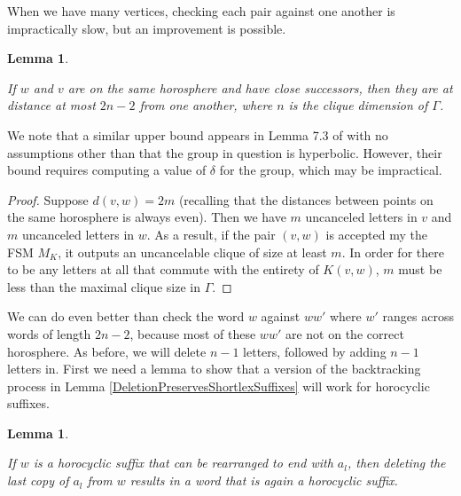 \documentclass{amsart}
\newtheorem{lemma}[theorem]{Lemma}
\theoremstyle{definition}
\theoremstyle{remark}
\begin{document}
	When we have many vertices, checking each pair against one another is impractically slow, but an improvement is possible. 
	
	\begin{lemma}\label{MaximumDistanceForDivergenceEdge}
		
		If $w$ and $v$ are on the same horosphere and have close successors, then they are at distance at most $2n-2$ from one another, where $n$ is the clique dimension of $\Gamma$.
		
	\end{lemma}
	
	We note that a similar upper bound appears in Lemma 7.3 of \cite{CGSR} with no assumptions other than that the group in question is hyperbolic. However, their bound requires computing a value of $\delta$ for the group, which may be impractical.
	
	\begin{proof}
		
		Suppose $d(v,w)=2m$ (recalling that the distances between points on the same horosphere is always even). Then we have $m$ uncanceled letters in $v$ and $m$ uncanceled letters in $w$. As a result, if the pair $(v,w)$ is accepted my the FSM $M_K$, it outputs an uncancelable clique of size at least $m$. In order for there to be any letters at all that commute with the entirety of $K(v,w)$, $m$ must be less than the maximal clique size in $\Gamma$.
	\end{proof}
	
	We can do even better than check the word $w$ against $ww'$ where $w'$ ranges across words of length $2n-2$, because most of these $ww'$ are not on the correct horosphere. As before, we will delete $n-1$ letters, followed by adding $n-1$ letters in. First we need a lemma to show that a version of the backtracking process in Lemma \ref{DeletionPreservesShortlexSuffixes} will work for horocyclic suffixes.
	
	\begin{lemma}\label{DeletionPreservesHorocyclicSuffixes}
		
		If $w$ is a horocyclic suffix that can be rearranged to end with $a_l$, then deleting the last copy of $a_l$ from $w$ results in a word that is again a horocyclic suffix.
		
	\end{lemma}
	
\end{document}
